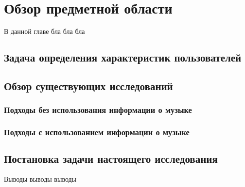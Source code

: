 \chapter{Обзор предметной области}

В данной главе бла бла бла

\section{Задача определения характеристик пользователей}

\section{Обзор существующих исследований}

\subsection{Подходы без использования информации о музыке}

\subsection{Подходы с использованием информации о музыке}

\section{Постановка задачи настоящего исследования}

\chapterconclusion

Выводы выводы выводы
